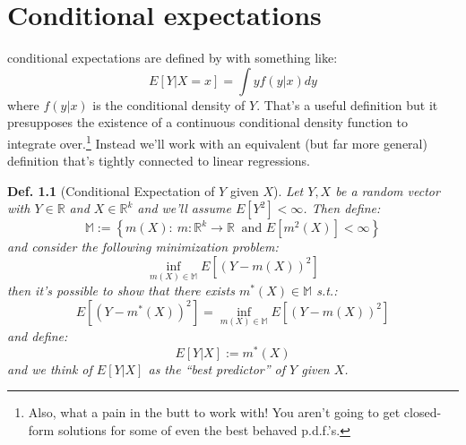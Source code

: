 \documentclass{tufte-book}
\theoremstyle{mytheoremstyle}
\theoremstyle{mylemstyle}
\theoremstyle{mydefstyle}
\newtheorem*{mydef}{Def.}
\begin{document}
\chapter{Conditional expectations}
 conditional expectations are defined by with something like:
	\[E[Y|X=x] = \int y f(y|x)dy\]
where \(f(y|x)\) is the conditional density of \(Y\). That's a useful definition but it presupposes the existence of a continuous conditional density function to integrate over.\footnote{Also, what a pain in the butt to work with! You aren't going to get closed-form solutions for some of even the best behaved p.d.f.'s.} Instead we'll work with an equivalent (but far more general) definition that's tightly connected to linear regressions. 

\begin{mydef}[Conditional Expectation of \(Y\) given \(X\)] Let \(Y, X\) be a random vector with \(Y\in \mathbb{R}\) and \(X \in \mathbb{R}^k\) and we'll assume \(E[Y^2] < \infty\). Then define: 
	\[\mathbb{M} := \left\{m(X):\ m:\mathbb{R}^k \rightarrow \mathbb{R}\ \text{ and } E[m^2(X)] < \infty \right\}\]
and consider the following minimization problem:
	\[\inf_{m(X) \in \mathbb{M}} E[(Y - m(X))^2]\]
then it's possible to show that there exists \(m^*(X) \in \mathbb{M}\) s.t.:
	\[E[(Y - m^*(X))^2] = \inf_{m(X) \in \mathbb{M}} E[(Y - m(X))^2]\]
and define:
	\[E[Y|X] := m^*(X)\]
and we think of \(E[Y|X]\) as the ``best predictor'' of \(Y\) given \(X\). 
\end{mydef}
\end{document}

